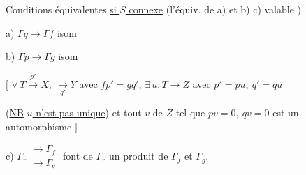 Conditions équivalentes \uline{si $S$ connexe} (l'équiv. de a) et b)  c) valable )

a) $\Gamma q\to\Gamma f$ isom

b) $\Gamma p\to\Gamma g$ isom

$\bigl[$ $\forall\,T\overset{p'}{\longrightarrow}X,\ \underset{q'}{\longrightarrow}Y$ avec $fp'=gq'$, $\exists\,u:T\to Z$ avec $p'=pu,\ q'=qu$

(\uline{NB} \uline{$u$ n'est pas  unique})  et tout  $v$ de $Z$ tel que $pv=0,\ qv=0$ est un automorphisme $\bigr]$

c) $\Gamma_r\substack{\longrightarrow\Gamma_f\\\longrightarrow\Gamma_g}$ font de $\Gamma_r$ un produit  de $\Gamma_f$ et $\Gamma_g$.

